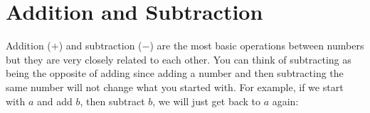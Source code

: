     \section{Addition and Subtraction}
            \nopagebreak
      \label{m38346*id172371}Addition ($+$) and subtraction ($-$) are the most basic operations between numbers but they are very closely related to each other. You can think of subtracting as being the opposite of adding since adding a number and then subtracting the same number will not change what you started with. For example, if we start with $a$ and add $b$, then subtract $b$, we will just get back to
$a$ again:\par 
      \label{m38346*uid6}\nopagebreak\noindent{}
